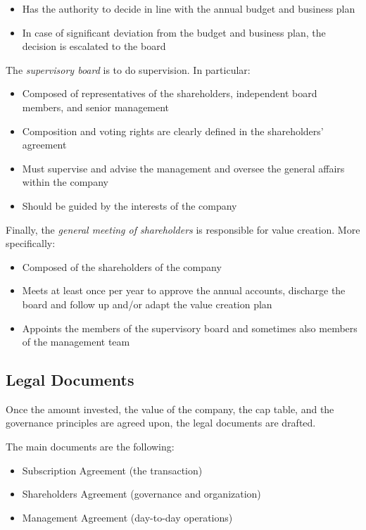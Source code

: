 \documentclass[a4paper]{extarticle}
\begin{document}
\begin{itemize}
    \item Has the authority to decide in line with the annual budget and business plan
    \item In case of significant deviation from the budget and business plan, the decision is escalated to the board
\end{itemize}

The \textit{supervisory board} is to do supervision. In particular:

\begin{itemize}
    \item Composed of representatives of the shareholders, independent board members, and senior management
    \item Composition and voting rights are clearly defined in the shareholders' agreement
    \item Must supervise and advise the management and oversee the general affairs within the company
    \item Should be guided by the interests of the company
\end{itemize}

Finally, the \textit{general meeting of shareholders} is responsible for value creation. More specifically:

\begin{itemize}
    \item Composed of the shareholders of the company
    \item Meets at least once per year to approve the annual accounts, discharge the board and follow up and/or adapt the value creation plan
    \item Appoints the members of the supervisory board and sometimes also members of the management team
\end{itemize}

\subsection{Legal Documents}

Once the amount invested, the value of the company, the cap table, and the governance principles are agreed upon, the legal documents are drafted.

The main documents are the following:

\begin{itemize}
    \item Subscription Agreement (the transaction)
    \item Shareholders Agreement (governance and organization)
    \item Management Agreement (day-to-day operations)
\end{itemize}
\end{document}
